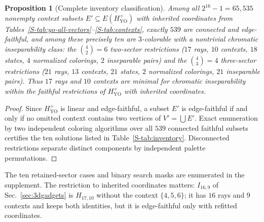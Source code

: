 \documentclass[aps,pra,reprint,superscriptaddress,longbibliography,nofootinbib,floatfix,10pt]{revtex4-2}
\newtheorem{proposition}[theorem]{Proposition}
\theoremstyle{definition}\newtheorem{definition}[theorem]{Definition}
\theoremstyle{remark}\newtheorem{remark}[theorem]{Remark}
\newcommand{\YO}{\mathrm{YO}}\newcommand{\ip}[2]{\langle #1,#2\rangle}
\begin{document}
\begin{proposition}[Complete inventory classification]\label{prop:search}
Among all $2^{16}-1=65{,}535$ nonempty context subsets $E'\subseteq E(H_{\YO}^{+})$ with inherited coordinates from Tables~\ref{S-tab:yo-all-vectors}--\ref{S-tab:contexts}, exactly $539$ are connected and edge-faithful, and among these \emph{precisely ten} are $3$-colorable with a nontrivial chromatic inseparability class: the $\binom{4}{2}=6$ two-sector restrictions ($17$ rays, $10$ contexts, $18$ states, $4$ normalized colorings, $2$ inseparable pairs) and the $\binom{4}{3}=4$ three-sector restrictions ($21$ rays, $13$ contexts, $21$ states, $2$ normalized colorings, $21$ inseparable pairs). Thus $17$ rays and $10$ contexts are minimal for chromatic inseparability within the faithful restrictions of $H_{\YO}^{+}$ with inherited coordinates.
\end{proposition}
\begin{proof}
Since $H_{\YO}^{+}$ is linear and edge-faithful, a subset $E'$ is edge-faithful if and only if no omitted context contains two vertices of $V'=\bigcup E'$. Exact enumeration by two independent coloring algorithms over all $539$ connected faithful subsets certifies the ten solutions listed in Table~\ref{S-tab:inventory}. Disconnected restrictions separate distinct components by independent palette permutations.
\end{proof}

The ten retained-sector cases and binary search masks are enumerated in the supplement. The restriction to inherited coordinates matters: $I_{16,9}$ of Sec.~\ref{sec:3dgadgets} is $H_{17,10}$ without the context $\{4,5,6\}$; it has $16$ rays and $9$ contexts and keeps both identities, but it is edge-faithful only with refitted coordinates.
\end{document}
